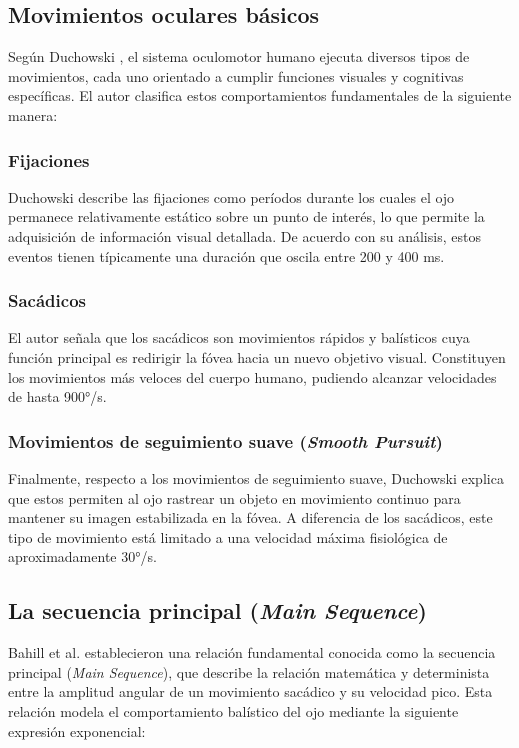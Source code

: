 \subsection{Movimientos oculares básicos}

Según Duchowski \cite{duchowski2017}, el sistema oculomotor humano ejecuta diversos tipos de movimientos, cada uno orientado a cumplir funciones visuales y cognitivas específicas. El autor clasifica estos comportamientos fundamentales de la siguiente manera:

\subsubsection{Fijaciones}
Duchowski \cite{duchowski2017} describe las fijaciones como períodos durante los cuales el ojo permanece relativamente estático sobre un punto de interés, lo que permite la adquisición de información visual detallada. De acuerdo con su análisis, estos eventos tienen típicamente una duración que oscila entre 200 y 400 ms.

\subsubsection{Sacádicos}
El autor señala que los sacádicos son movimientos rápidos y balísticos cuya función principal es redirigir la fóvea hacia un nuevo objetivo visual. Constituyen los movimientos más veloces del cuerpo humano, pudiendo alcanzar velocidades de hasta 900°/s.

\subsubsection{Movimientos de seguimiento suave (\textit{Smooth Pursuit})}
Finalmente, respecto a los movimientos de seguimiento suave, Duchowski \cite{duchowski2017} explica que estos permiten al ojo rastrear un objeto en movimiento continuo para mantener su imagen estabilizada en la fóvea. A diferencia de los sacádicos, este tipo de movimiento está limitado a una velocidad máxima fisiológica de aproximadamente 30°/s.

\subsection{La secuencia principal (\textit{Main Sequence})}

Bahill et al. \cite{bahill1975} establecieron una relación fundamental conocida como la secuencia principal (\textit{Main Sequence}), que describe la relación matemática y determinista entre la amplitud angular de un movimiento sacádico y su velocidad pico. Esta relación modela el comportamiento balístico del ojo mediante la siguiente expresión exponencial:

